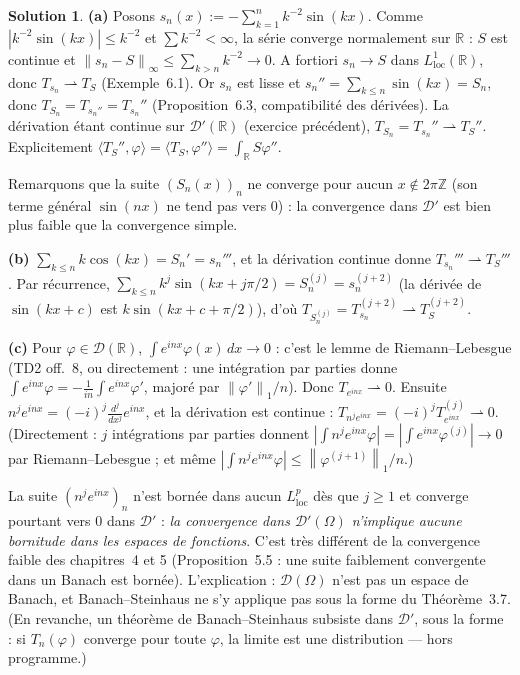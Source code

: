 \documentclass[11pt,a4paper]{article}
\newcommand{\R}{\mathbb{R}}
\newcommand{\Z}{\mathbb{Z}}
\newcommand{\norm}[1]{\left\|#1\right\|}
\newcommand{\D}{\mathcal{D}}
\theoremstyle{definition}
\newtheorem*{solution}{Solution}
\begin{document}
\begin{solution}
\noindent\textbf{(a)} Posons $s_n(x):=-\sum_{k=1}^nk^{-2}\sin(kx)$. Comme $|k^{-2}\sin(kx)|\le k^{-2}$ et $\sum k^{-2}<\infty$, la série converge normalement sur $\R$ : $S$ est continue et $\norm{s_n-S}_\infty\le\sum_{k>n}k^{-2}\to0$. A fortiori $s_n\to S$ dans $L^1_{\mathrm{loc}}(\R)$, donc $T_{s_n}\rightharpoonup T_S$ (Exemple~6.1). Or $s_n$ est lisse et $s_n''=\sum_{k\le n}\sin(kx)=S_n$, donc $T_{S_n}=T_{s_n''}=T_{s_n}''$ (Proposition~6.3, compatibilité des dérivées). La dérivation étant continue sur $\D'(\R)$ (exercice précédent), $T_{S_n}=T_{s_n}''\rightharpoonup T_S''$. Explicitement $\langle T_S'',\varphi\rangle=\langle T_S,\varphi''\rangle=\int_\R S\varphi''$.

Remarquons que la suite $(S_n(x))_n$ ne converge pour aucun $x\notin2\pi\Z$ (son terme général $\sin(nx)$ ne tend pas vers $0$) : la convergence dans $\D'$ est bien plus faible que la convergence simple.

\medskip
\noindent\textbf{(b)} $\sum_{k\le n}k\cos(kx)=S_n'=s_n'''$, et la dérivation continue donne $T_{s_n}'''\rightharpoonup T_S'''$. Par récurrence, $\sum_{k\le n}k^j\sin(kx+j\pi/2)=S_n^{(j)}=s_n^{(j+2)}$ (la dérivée de $\sin(kx+c)$ est $k\sin(kx+c+\pi/2)$), d'où $T_{S_n^{(j)}}=T_{s_n}^{(j+2)}\rightharpoonup T_S^{(j+2)}$.

\medskip
\noindent\textbf{(c)} Pour $\varphi\in\D(\R)$, $\int e^{inx}\varphi(x)\,dx\to0$ : c'est le lemme de Riemann--Lebesgue (TD2 off.~8, ou directement : une intégration par parties donne $\int e^{inx}\varphi=-\frac1{in}\int e^{inx}\varphi'$, majoré par $\norm{\varphi'}_1/n$). Donc $T_{e^{inx}}\rightharpoonup0$. Ensuite $n^je^{inx}=(-i)^j\frac{d^j}{dx^j}e^{inx}$, et la dérivation est continue : $T_{n^je^{inx}}=(-i)^jT_{e^{inx}}^{(j)}\rightharpoonup0$. (Directement : $j$ intégrations par parties donnent $|\int n^je^{inx}\varphi|=|\int e^{inx}\varphi^{(j)}|\to0$ par Riemann--Lebesgue ; et même $|\int n^je^{inx}\varphi|\le\norm{\varphi^{(j+1)}}_1/n$.)

La suite $(n^je^{inx})_n$ n'est bornée dans aucun $L^p_{\mathrm{loc}}$ dès que $j\ge1$ et converge pourtant vers $0$ dans $\D'$ : \emph{la convergence dans $\D'(\Omega)$ n'implique aucune bornitude dans les espaces de fonctions}. C'est très différent de la convergence faible des chapitres~4 et 5 (Proposition~5.5 : une suite faiblement convergente dans un Banach est bornée). L'explication : $\D(\Omega)$ n'est pas un espace de Banach, et Banach--Steinhaus ne s'y applique pas sous la forme du Théorème~3.7. (En revanche, un théorème de Banach--Steinhaus subsiste dans $\D'$, sous la forme : si $T_n(\varphi)$ converge pour toute $\varphi$, la limite est une distribution — hors programme.)
\end{solution}
\end{document}
